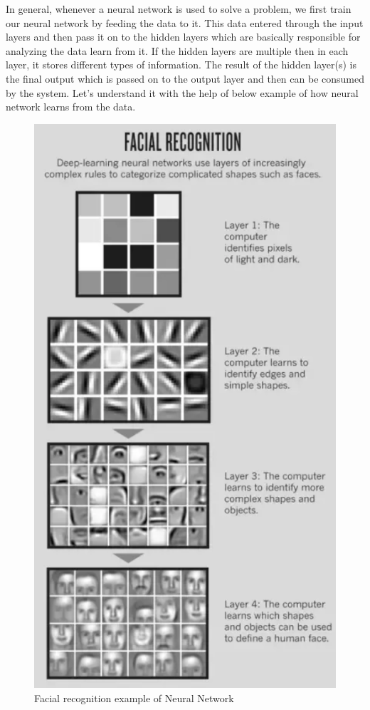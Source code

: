 \par
In general, whenever a neural network is used to solve a problem, we first train our neural network by feeding the data to it. This data entered through the input layers and then pass it on to the hidden layers which are basically responsible for analyzing the data learn from it. If the hidden layers are multiple then in each layer, it stores different types of information. The result of the hidden layer(s) is the final output which is passed on to the output layer and then can be consumed by the system. Let's understand it with the help of below example of how neural network learns from the data.
\begin{figure}[H]
\centering
\includegraphics[scale=0.6]{images/Chapter2/ANN-example.PNG}
\caption{Facial recognition example of Neural Network \cite{hidden_layer}}
\label{fr-ex-neural-network}
\end{figure}
